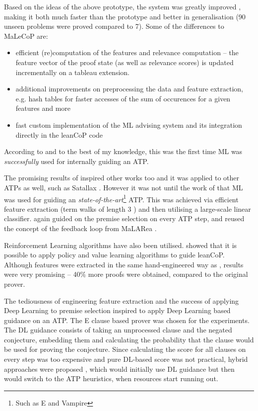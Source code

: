\documentclass{article}
\begin{document}
Based on the ideas of the above prototype, the system was greatly improved
\citep{femalecop}, making it both much faster than the prototype and better in
generalisation (90 unseen problems were proved compared to 7). Some of the
differences to MaLeCoP are:
\begin{itemize}
    \item efficient (re)computation of the features and relevance
        computation -- the feature vector of the proof state (as well as
        relevance scores) is updated incrementally on a tableau extension.
    \item additional improvements on preprocessing the data and feature
        extraction, e.g. hash tables for faster accesses of the sum of
        occurences for a given features and more
    \item fast custom implementation of the ML advising system and its
        integration directly in the leanCoP code
\end{itemize}
According to \cite{femalecop} and to the best of my knowledge, this was
the first time ML was \emph{successfully} used for internally guiding an ATP.

\nocite{SatallaxProver}

The promising results of \cite{femalecop} inspired other works too and it was
applied to other ATPs as well, such as Satallax \citep{Satallax}. However it
was not until the work of \cite{Enigma} that ML was used for guiding an
\emph{state-of-the-art}\footnote{Such as E and Vampire} ATP. This was achieved
via efficient feature extraction (term walks of length 3 \citep[\S
3.2]{Enigma}) and then utilising a large-scale linear classifier. \cite{Enigma}
again guided on the premise selection on every ATP step, and reused the concept
of the feedback loop from MaLARea \citep{MaLARea}.

Reinforcement Learning algorithms have also been utilised. \cite{RLTP} showed that
it is possible to apply policy and value learning algorithms to guide
leanCoP. Although features were extracted in the same
hand-engineered way as \cite{Enigma}, results were very promising -- 40\% more
proofs were obtained, compared to the original prover.

The tediousness of engineering feature extraction and the success of applying
Deep Learning to premise selection \citep{DeepMath} inspired \cite{DNGPS} to
apply Deep Learning based guidance on an ATP. The E clause based prover was
chosen for the experiments. The DL guidance consists of taking an unprocessed
clause and the negated conjecture, embedding them and calculating the
probability that the clause would be used for proving the conjecture. Since
calculating the score for all clauses on every step was too expensive and pure
DL-based score was not practical, hybrid approaches were proposed \citep[\S
5.2.1]{DNGPS}, which would initially use DL guidance but then would switch to
the ATP heuristics, when resources start running out. 
\end{document}
